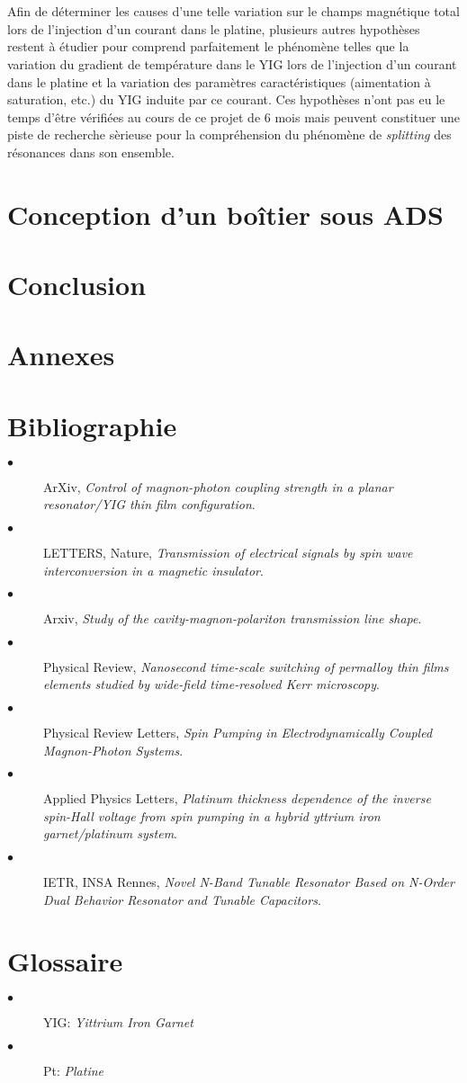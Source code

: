 \documentclass[12pt,fleqn]{book} %
\begin{document}
~\\\\Afin de déterminer les causes d'une telle variation sur le champs magnétique total lors de l'injection d'un courant dans le platine, plusieurs autres hypothèses restent à étudier pour comprend parfaitement le phénomène telles que la variation du gradient de température dans le YIG lors de l'injection d'un courant dans le platine et la variation des paramètres caractéristiques (aimentation à saturation, etc.) du YIG induite par ce courant. Ces hypothèses n'ont pas eu le temps d'être vérifiées au cours de ce projet de 6 mois mais peuvent constituer une piste de recherche sèrieuse pour la compréhension
du phénomène de \emph{splitting} des résonances dans son ensemble.
\part{Conception d'un boîtier sous ADS}
\setcounter{part}{-3}
\part{Conclusion}

\setcounter{part}{-4}
\part{Annexes}

\setcounter{part}{-5}
\part{Bibliographie}
\label{Sources}
\appendix
\begin{description}
 \item[$\bullet$] ArXiv, \emph{Control of magnon-photon coupling strength in a planar resonator/YIG thin film configuration}.
 \item[$\bullet$] LETTERS, Nature, \emph{Transmission of electrical signals by spin wave interconversion in a magnetic insulator}.
 \item[$\bullet$] Arxiv, \emph{Study of the cavity-magnon-polariton transmission line shape}.
 \item[$\bullet$] Physical Review, \emph{Nanosecond time-scale switching of permalloy thin films elements studied by wide-field time-resolved Kerr microscopy}.
 \item[$\bullet$] Physical Review Letters, \emph{Spin Pumping in Electrodynamically Coupled Magnon-Photon Systems}.
 \item[$\bullet$] Applied Physics Letters, \emph{Platinum thickness dependence of the inverse spin-Hall voltage from spin pumping in a hybrid yttrium iron garnet/platinum system}.
 \item[$\bullet$] IETR, INSA Rennes, \emph{Novel N-Band Tunable Resonator Based on N-Order Dual Behavior Resonator and Tunable Capacitors}.
\end{description}

\setcounter{part}{-6}
\part{Glossaire}
\begin{description}
 \item[$\bullet$] YIG: \emph{Yittrium Iron Garnet}
 \item[$\bullet$] Pt: \emph{Platine}
\end{description}
\end{document}
